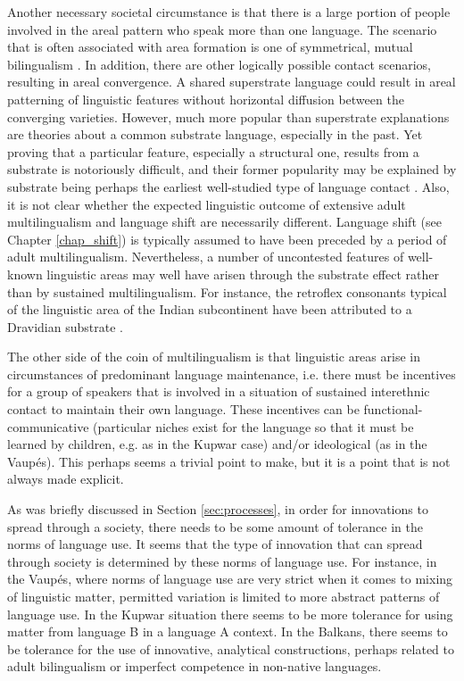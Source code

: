 \documentclass[output=paper]{langscibook}
\begin{document}
Another necessary societal circumstance is that there is a large portion of people involved in the areal pattern who speak more than one language. The scenario that is often associated with area formation is one of symmetrical, mutual bilingualism \parencite{muysken2010scenarios}. In addition, there are other logically possible contact scenarios, resulting in areal convergence. A shared superstrate language could result in areal patterning of linguistic features without horizontal diffusion between the converging varieties. However, much more popular than superstrate explanations are theories about a common substrate language, especially in the past. Yet proving that a particular feature, especially a structural one, results from a substrate is notoriously difficult, and their former popularity may be explained by substrate being perhaps the earliest well-studied type of language contact \parencite[see, e.g.,][14--16]{wahlström2015}. Also, it is not clear whether the expected linguistic outcome of extensive adult multilingualism and language shift are necessarily different. Language shift (see Chapter \ref{chap_shift}) is typically assumed to have been preceded by a period of adult multilingualism. Nevertheless, a number of uncontested features of well-known linguistic areas may well have arisen through the substrate effect rather than by sustained multilingualism. For instance, the retroflex consonants typical of the linguistic area of the Indian subcontinent have been attributed to a Dravidian substrate \parencite[39--40]{thomasonetal1988language}.


The other side of the coin of multilingualism is that linguistic areas arise in circumstances of predominant language maintenance, i.e. there must be incentives for a group of speakers that is involved in a situation of sustained interethnic contact to maintain their own language. These incentives can be functional-communicative (particular niches exist for the language so that it must be learned by children, e.g. as in the Kupwar case) and/or ideological (as in the Vaupés). This perhaps seems a trivial point to make, but it is a point that is not always made explicit.


As was briefly discussed in Section \ref{sec:processes}, in order for innovations to spread through a society, there needs to be some amount of tolerance in the norms of language use. It seems that the type of innovation that can spread through society is determined by these norms of language use. For instance, in the Vaupés, where norms of language use are very strict when it comes to mixing of linguistic matter, permitted variation is limited to more abstract patterns of language use. In the Kupwar situation there seems to be more tolerance for using matter from language B in a language A context. In the Balkans, there seems to be tolerance for the use of innovative, analytical constructions, perhaps related to adult bilingualism or imperfect competence in non-native languages.
\end{document}
